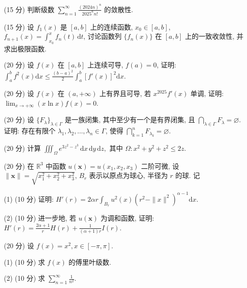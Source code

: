 (15 分) 判断级数 $\sum_{n=1}^{\infty} \frac{(2024n)^n}{2025^n n!}$ 的敛散性.\par
(15 分) 设 $f_{1}(x)$ 是 $[a, b]$ 上的连续函数, $x_{0} \in [a, b]$, $f_{n+1}(x) = \int_{x_{0}}^{x} f_{n}(t) \, \mathrm{d}t$, 讨论函数列 $\{f_{n}(x)\}$ 在 $[a, b]$ 上的一致收敛性, 并求出极限函数.\par
(20 分) 设 $f(x)$ 在 $[a, b]$ 上连续可导, $f(a) = 0$, 证明: $\int_{a}^{b} f^{2}(x) \mathrm{d}x \leq \frac{(b - a)^{2}}{2} \int_{a}^{b} [f'(x)]^{2} \mathrm{d}x$.\par
(20 分) 设 $f(x)$ 在 $(a, +\infty)$ 上有界且可导, 若 $x^{2025}f'(x)$ 单调, 证明: $\lim_{x \to +\infty} (x \ln x)f(x) = 0$.\par
(20 分) 设 $\{F_{\lambda}\}_{\lambda \in \Gamma}$ 是一族闭集, 其中至少有一个是有界闭集, 且 $\bigcap_{\lambda \in \Gamma} F_{\lambda} = \varnothing$. 证明: 存在有限个 $\lambda_1, \lambda_2, \dots, \lambda_n \in \Gamma$, 使得 $\bigcap_{k=1}^{n} F_{\lambda_k} = \varnothing$.\par
(20 分) 计算 $\iiint_{\Omega} e^{3z^2 - z^3} \, \mathrm{d}x \, \mathrm{d}y \, \mathrm{d}z,$ 其中 $\Omega: x^2 + y^2 + z^2 \leq 2z.$\par
\par{}
(20 分) 在 $\mathbb{R}^3$ 中函数 $u(\pmb{x}) = u(x_1, x_2, x_3)$ 二阶可微, 设 $\| \pmb{x} \| = \sqrt{x_1^2 + x_2^2 + x_3^2}$, $B_r$ 表示以原点为球心, 半径为 $r$ 的球. 记\par
\nopagebreak[4]
(1) (10 分) 证明: $H'(r) = 2\alpha r \int_{B_r} u^2(x)(r^2 - \|x\|^2)^{\alpha - 1} \mathrm{d}x.$\par
(2) (10 分) 进一步地, 若 $u(\pmb{x})$ 为调和函数, 证明: $H'(r) = \frac{2\alpha + 1}{r} H(r) + \frac{1}{(\alpha + 1)r} I(r)$.\par
(20 分) 设 $f(x) = x^2, x \in [-\pi, \pi]$.\par
(1) (10 分) 求  $f(x)$  的傅里叶级数.\par
(2) (10 分) 求 $\sum_{n=1}^{\infty} \frac{1}{n^2}$.\par
